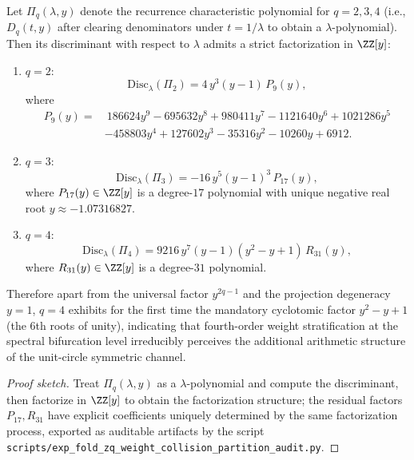 \begin{conclusion}\label{con:xi-terminal-zq-discriminant-factorization}
Let \(\Pi_q(\lambda,y)\) denote the recurrence characteristic polynomial for \(q=2,3,4\) (i.e., \(D_q(t,y)\) after clearing denominators under \(t=1/\lambda\) to obtain a \(\lambda\)-polynomial).
Then its discriminant with respect to \(\lambda\) admits a strict factorization in \(\ZZ[y]\):
\begin{enumerate}
  \item \(q=2\):
  \[
  \mathrm{Disc}_{\lambda}(\Pi_2)=4\,y^{3}(y-1)\,P_{9}(y),
  \]
  where
  \[
  \begin{aligned}
  P_{9}(y)=&\ 186624y^9-695632y^8+980411y^7-1121640y^6+1021286y^5\\
  &-458803y^4+127602y^3-35316y^2-10260y+6912.
  \end{aligned}
  \]
  \item \(q=3\):
  \[
  \mathrm{Disc}_{\lambda}(\Pi_3)=-16\,y^{5}(y-1)^3\,P_{17}(y),
  \]
  where \(P_{17}(y)\in\ZZ[y]\) is a degree-\(17\) polynomial with unique negative real root \(y\approx-1.07316827\).
  \item \(q=4\):
  \[
  \mathrm{Disc}_{\lambda}(\Pi_4)=9216\,y^{7}(y-1)(y^2-y+1)\,R_{31}(y),
  \]
  where \(R_{31}(y)\in\ZZ[y]\) is a degree-\(31\) polynomial.
\end{enumerate}
Therefore apart from the universal factor \(y^{2q-1}\) and the projection degeneracy \(y=1\),
\(q=4\) exhibits for the first time the mandatory cyclotomic factor \(y^2-y+1\) (the 6th roots of unity),
indicating that fourth-order weight stratification at the spectral bifurcation level irreducibly perceives the additional arithmetic structure of the unit-circle symmetric channel.
\end{conclusion}
\begin{proof}[Proof sketch]
Treat \(\Pi_q(\lambda,y)\) as a \(\lambda\)-polynomial and compute the discriminant, then factorize in \(\ZZ[y]\) to obtain the factorization structure;
the residual factors \(P_{17},R_{31}\) have explicit coefficients uniquely determined by the same factorization process, exported as auditable artifacts by the script
\texttt{scripts/exp\_fold\_zq\_weight\_collision\_partition\_audit.py}.
\end{proof}

